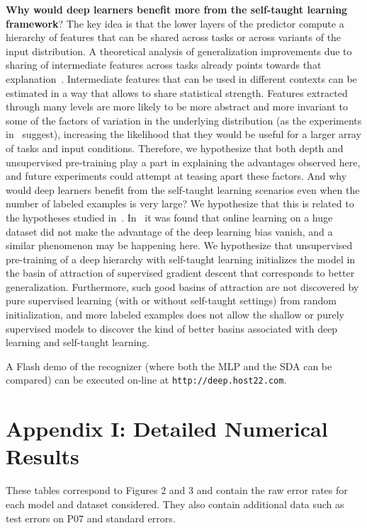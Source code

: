 \documentclass{article} %
\begin{document}
{\bf Why would deep learners benefit more from the self-taught learning framework}?
The key idea is that the lower layers of the predictor compute a hierarchy
of features that can be shared across tasks or across variants of the
input distribution. A theoretical analysis of generalization improvements
due to sharing of intermediate features across tasks already points
towards that explanation~\cite{baxter95a}.
Intermediate features that can be used in different
contexts can be estimated in a way that allows to share statistical 
strength. Features extracted through many levels are more likely to
be more abstract and more invariant to some of the factors of variation
in the underlying distribution (as the experiments in~\citet{Goodfellow2009} suggest),
increasing the likelihood that they would be useful for a larger array
of tasks and input conditions.
Therefore, we hypothesize that both depth and unsupervised
pre-training play a part in explaining the advantages observed here, and future
experiments could attempt at teasing apart these factors.
And why would deep learners benefit from the self-taught learning
scenarios even when the number of labeled examples is very large?
We hypothesize that this is related to the hypotheses studied
in~\citet{Erhan+al-2010}. In~\citet{Erhan+al-2010}
it was found that online learning on a huge dataset did not make the
advantage of the deep learning bias vanish, and a similar phenomenon
may be happening here. We hypothesize that unsupervised pre-training
of a deep hierarchy with self-taught learning initializes the
model in the basin of attraction of supervised gradient descent
that corresponds to better generalization. Furthermore, such good
basins of attraction are not discovered by pure supervised learning
(with or without self-taught settings) from random initialization, and more labeled examples
does not allow the shallow or purely supervised models to discover
the kind of better basins associated
with deep learning and self-taught learning.
 
A Flash demo of the recognizer (where both the MLP and the SDA can be compared) 
can be executed on-line at {\tt http://deep.host22.com}.


\section*{Appendix I: Detailed Numerical Results}

These tables correspond to Figures 2 and 3 and contain the raw error rates for each model and dataset considered.
They also contain additional data such as test errors on P07 and standard errors.
\end{document}
